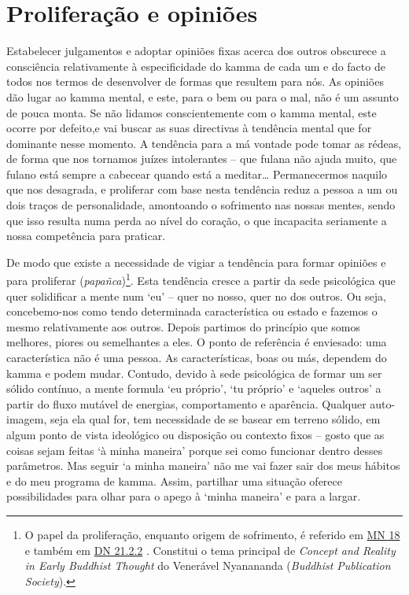 \section{Proliferação e opiniões}

Estabelecer julgamentos e adoptar opiniões fixas acerca dos outros obscurece a consciência relativamente à especificidade do kamma de cada um e do facto de todos nos termos de desenvolver de formas que resultem para nós. As opiniões dão lugar ao kamma mental, e este, para o bem ou para o mal, não é um assunto de pouca monta. Se não lidamos conscientemente com o kamma mental, este ocorre por defeito,e vai buscar as suas directivas à tendência mental que for dominante nesse momento. A tendência para a má vontade pode tomar as rédeas, de forma que nos tornamos juízes intolerantes -- que fulana não ajuda muito, que fulano está sempre a cabecear quando está a meditar\ldots{} Permanecermos naquilo que nos desagrada, e proliferar com base nesta tendência reduz a pessoa a um ou dois traços de personalidade, amontoando o sofrimento nas nossas mentes, sendo que isso resulta numa perda ao nível do coração, o que incapacita seriamente a nossa competência para praticar.

De modo que existe a necessidade de vigiar a tendência para formar opiniões e para proliferar (\emph{papañca})\footnote{O papel da proliferação, enquanto origem de sofrimento, é referido em \href{https://suttacentral.net/mn18/en/sujato}{MN 18} e também em \href{https://suttacentral.net/dn21/en/sujato}{DN 21.2.2} . Constitui o tema principal de \emph{Concept and Reality in Early Buddhist Thought} do Venerável Nyanananda (\emph{Buddhist Publication Society}).}. Esta tendência cresce a partir da sede psicológica que quer solidificar a mente num `eu' -- quer no nosso, quer no dos outros. Ou seja, concebemo-nos como tendo determinada característica ou estado e fazemos o mesmo relativamente aos outros. Depois partimos do princípio que somos melhores, piores ou semelhantes a eles. O ponto de referência é enviesado: uma característica não é uma pessoa. As características, boas ou más, dependem do kamma e podem mudar. Contudo, devido à sede psicológica de formar um ser sólido contínuo, a mente formula `eu próprio', `tu próprio' e `aqueles outros' a partir do fluxo mutável de energias, comportamento e aparência. Qualquer auto-imagem, seja ela qual for, tem necessidade de se basear em terreno sólido, em algum ponto de vista ideológico ou disposição ou contexto fixos -- gosto que as coisas sejam feitas `à minha maneira' porque sei como funcionar dentro desses parâmetros. Mas seguir `a minha maneira' não me vai fazer sair dos meus hábitos e do meu programa de kamma. Assim, partilhar uma situação oferece possibilidades para olhar para o apego à `minha maneira' e para a largar.

